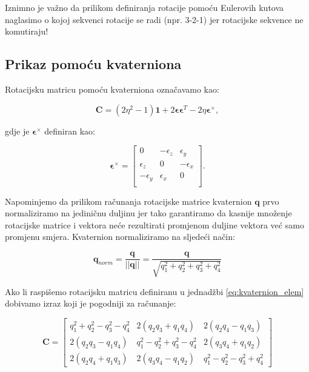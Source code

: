 \documentclass[times, utf8, diplomski, numeric]{templates/template}
\begin{document}
{{{            Iznimno je važno da prilikom definiranja rotacije pomoću Eulerovih kutova naglasimo o kojoj sekvenci rotacije se radi (npr. 3-2-1) jer rotacijske sekvence ne komutiraju!
        }

        \subsection{Prikaz pomoću kvaterniona}{
            Rotacijsku matricu pomoću kvaterniona označavamo kao:

            \begin{equation}
                \boldsymbol{C} = (2\eta^2-1)\boldsymbol{1} + 2\boldsymbol\epsilon\boldsymbol\epsilon^{T}-2\eta\boldsymbol\epsilon^{\times},
            \label{eq:quat_rot_matrix}
            \end{equation}

            gdje je $\boldsymbol\epsilon^{\times}$ definiran kao:

            \begin{equation}
                \boldsymbol\epsilon^{\times} =
                \begin{bmatrix}
                    0 & -\epsilon_{z} & \epsilon_{y} \\
                    \epsilon_{z} & 0 & -\epsilon_{x} \\
                    -\epsilon_{y} & \epsilon_{x} & 0 \\
                \end{bmatrix}
                .
            \end{equation}

            Napominjemo da prilikom računanja rotacijske matrice kvaternion $\boldsymbol{q}$ prvo normaliziramo na jediničnu duljinu jer tako garantiramo da kasnije množenje rotacijske matrice i vektora neće rezultirati promjenom duljine vektora već samo promjenu smjera. Kvaternion normaliziramo na sljedeći način:

            \begin{equation}
                \boldsymbol{q}_{norm} = \frac{\boldsymbol{q}}{||\boldsymbol{q}||} = \frac{\boldsymbol{q}}{\sqrt{q_1^2 + q_2^2 + q_3^2 + q_4^2}}
            \end{equation}

            Ako li raspišemo rotacijsku matricu definiranu u jednadžbi \ref{eq:kvaternion_elem} dobivamo izraz \cite{uvod_u_svemirske} koji je pogodniji za računanje:

            \begin{equation}
                \boldsymbol{C} =
                \begin{bmatrix}
                    q_1^2 + q_2^2 - q_3^2 - q_4^2 & 2(q_2q_3 + q_1q_4) & 2(q_2q_4 - q_1q_3) \\
                    2(q_2q_3 - q_1q_4) & q_1^2 - q_2^2 + q_3^2 - q_4^2 & 2(q_3q_4 + q_1q_2) \\
                    2(q_2q_4 + q_1q_3) & 2(q_3q_4 - q_1q_2) & q_1^2 - q_2^2 - q_3^2 + q_4^2 
                \end{bmatrix}
            \label{eq:rot_mat_quat}
            \end{equation}

}}}
\end{document}
